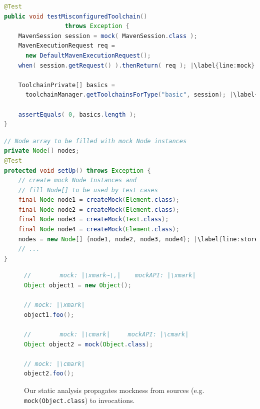 \begin{lstlisting}[basicstyle=\ttfamily, caption={This code snippet illustrates an example from maven-core, where calls to both the focal method \texttt{getToolchainsForType()} and to mock \texttt{session}'s \texttt{getRequest()} method occur in test \textit{testMisconfiguredToolchain()}.},
basicstyle=\scriptsize\ttfamily,language = Java, framesep=4.5mm, escapechar=|,
framexleftmargin=1.0mm, captionpos=b, label=lis:mockCall, morekeywords={@Test}]
@Test
public void testMisconfiguredToolchain()
                 throws Exception {
    MavenSession session = mock( MavenSession.class );
    MavenExecutionRequest req = 
      new DefaultMavenExecutionRequest();
    when( session.getRequest() ).thenReturn( req ); |\label{line:mock}|
    
    ToolchainPrivate[] basics =
      toolchainManager.getToolchainsForType("basic", session); |\label{line:real}|
    
    assertEquals( 0, basics.length );
}
\end{lstlisting}

\begin{lstlisting}[basicstyle=\ttfamily, caption={This example illustrates a field array container holding mock objects from \textit{setup()} in \texttt{NodeListIteratorTest.java}.},
basicstyle=\scriptsize\ttfamily,language = Java, framesep=4.5mm, framexleftmargin=1.0mm, captionpos=b, label=lis:container, escapechar=|, morekeywords={@Test}]
// Node array to be filled with mock Node instances
private Node[] nodes;
@Test
protected void setUp() throws Exception {
    // create mock Node Instances and 
    // fill Node[] to be used by test cases
    final Node node1 = createMock(Element.class);
    final Node node2 = createMock(Element.class);
    final Node node3 = createMock(Text.class);
    final Node node4 = createMock(Element.class);
    nodes = new Node[] {node1, node2, node3, node4}; |\label{line:storeMocksInArray}|
    // ...
}
\end{lstlisting}


\begin{figure}
\begin{lstlisting}[basicstyle=\ttfamily,
basicstyle=\scriptsize\ttfamily,language = Java, framesep=4.5mm, framexleftmargin=1.0mm, captionpos=b, escapechar=|, morekeywords={@Test}]
//        mock: |\xmark~\,|    mockAPI: |\xmark|
Object object1 = new Object();

// mock: |\xmark|
object1.foo();

//        mock: |\cmark|     mockAPI: |\cmark|
Object object2 = mock(Object.class);

// mock: |\cmark|
object2.foo();
\end{lstlisting}
    
    \caption{Our static analysis propagates mockness from sources (e.g. \texttt{mock(Object.class}) to invocations.}
    \label{fig:mockMethodIllustration}
    
\end{figure}

